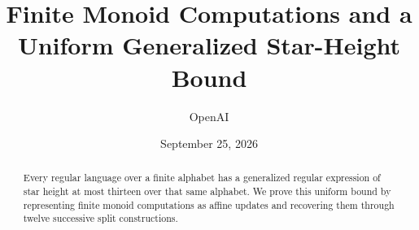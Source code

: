 \documentclass[11pt]{article}
\title{Finite Monoid Computations and a Uniform Generalized Star-Height Bound}
\author{OpenAI}
\date{September 25, 2026}
\theoremstyle{definition}
\theoremstyle{remark}
\numberwithin{equation}{section}
\begin{document}
\maketitle
\begin{abstract}
Every regular language over a finite alphabet has a generalized regular
expression of star height at most thirteen over that same alphabet.
We prove this uniform bound by representing finite monoid computations as
affine updates and recovering them through twelve successive split
constructions.
\end{abstract}









\end{document}
